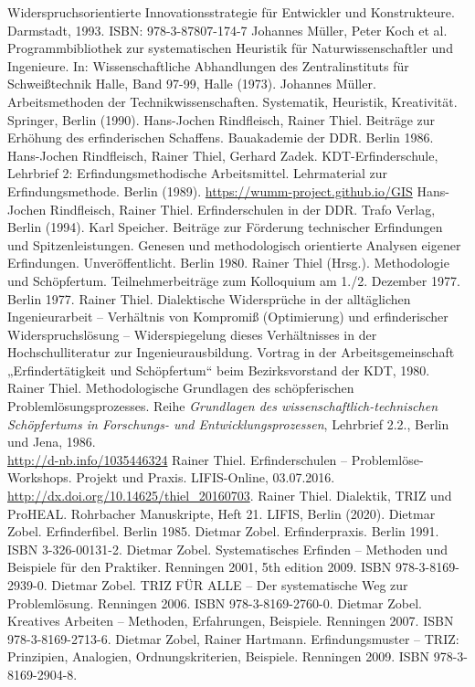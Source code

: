 \documentclass[11pt,a4paper]{article}
\begin{document}
\begin{thebibliography}{xxx}
  Widerspruchsorientierte Innovationsstrategie für Entwickler und
  Konstrukteure.  Darmstadt, 1993.  ISBN: 978-3-87807-174-7
 Johannes Müller, Peter Koch et al. Programmbibliothek
  zur systematischen Heuristik für Naturwissenschaftler und Ingenieure. In:
  Wissenschaftliche Abhandlungen des Zentralinstituts für Schweißtechnik
  Halle, Band 97-99, Halle (1973).
 Johannes Müller. Arbeitsmethoden der
  Technikwissenschaften.  Systematik, Heuristik, Kreativität. Springer, Berlin
  (1990).
 Hans-Jochen Rindfleisch, Rainer Thiel. Beiträge zur Erhöhung
  des erfinderischen Schaffens. Bauakademie der DDR. Berlin 1986.
 Hans-Jochen Rindfleisch, Rainer Thiel, Gerhard Zadek.
  KDT-Erfinderschule, Lehrbrief 2: Erfindungs­methodische Arbeitsmittel.
  Lehrmaterial zur Erfindungsmethode. Berlin (1989).
  \url{https://wumm-project.github.io/GIS}
 Hans-Jochen Rindfleisch, Rainer Thiel. Erfinderschulen in der
  DDR. Trafo Verlag, Berlin (1994).
 Karl Speicher. Beiträge zur Förderung technischer
  Erfindungen und Spitzenleistungen. Genesen und methodologisch orientierte
  Analysen eigener Erfindungen. Unveröffentlicht. Berlin 1980.
 Rainer Thiel (Hrsg.). Methodologie und Schöpfertum.
  Teilnehmerbeiträge zum Kolloquium am 1./2. Dezember 1977. Berlin 1977.
 Rainer Thiel. Dialektische Widersprüche in der
  alltäglichen Ingenieurarbeit -- Verhältnis von Kompromiß (Optimierung) und
  erfinderischer Widerspruchslösung -- Widerspiegelung dieses Verhältnisses in
  der Hochschulliteratur zur Ingenieurausbildung. Vortrag in der
  Arbeitsgemeinschaft „Erfindertätigkeit und Schöpfertum“ beim Bezirksvorstand
  der KDT, 1980.
 Rainer Thiel.  Methodologische Grundlagen des
  schöpferischen Problem\-lösungs\-pro\-zesses. Reihe \emph{Grundlagen des
    wissenschaftlich-technischen Schöpfertums in Forschungs- und
    Entwicklungsprozessen}, Lehrbrief 2.2., Berlin und Jena,
  1986.\\ \url{http://d-nb.info/1035446324}
 Rainer Thiel.  Erfinderschulen – Problemlöse-Workshops.
  Projekt und Praxis. LIFIS-Online, 03.07.2016.
  \url{http://dx.doi.org/10.14625/thiel_20160703}.
 Rainer Thiel.  Dialektik, TRIZ und ProHEAL. Rohrbacher
   Manuskripte, Heft 21. LIFIS, Berlin (2020).
 Dietmar Zobel. Erfinderfibel. Berlin 1985.
 Dietmar Zobel. Erfinderpraxis. Berlin 1991. ISBN
  3-326-00131-2.
 Dietmar Zobel. Systematisches Erfinden -- Methoden und
  Beispiele für den Praktiker. Renningen 2001, 5th edition 2009. ISBN
  978-3-8169-2939-0.
 Dietmar Zobel. TRIZ FÜR ALLE -- Der systematische Weg zur
  Problemlösung. Renningen 2006. ISBN 978-3-8169-2760-0.
 Dietmar Zobel. Kreatives Arbeiten – Methoden, Erfahrungen,
  Beispiele.  Renningen 2007. ISBN 978-3-8169-2713-6. 
 Dietmar Zobel, Rainer Hartmann. Erfindungsmuster -- TRIZ:
  Prinzipien, Analogien, Ordnungskriterien, Beispiele.  Renningen 2009. ISBN
  978-3-8169-2904-8.
\end{thebibliography}
\end{document}
